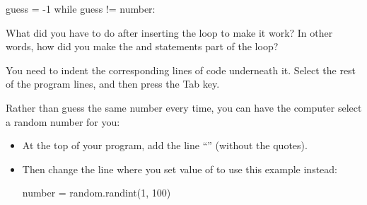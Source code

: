 \begin{pythlst}
    guess = -1
    while guess != number:
\end{pythlst}

\vspace{1em}


\Q What did you have to do after inserting the  loop to make it work?
In other words, how did you make the  and  statements part of the  loop?

\begin{answer}
You need to indent the corresponding lines of code underneath it.
Select the rest of the program lines, and then press the Tab key.
\end{answer}


\Q Rather than guess the same number every time, you can have the computer select a random number for you:
\begin{itemize}[itemsep=2pt]
\item At the top of your program, add the line ``'' (without the quotes).
\item Then change the line where you set value of  to use this example instead:
\begin{pythlst}
number = random.randint(1, 100)
\end{pythlst}
\end{itemize}
